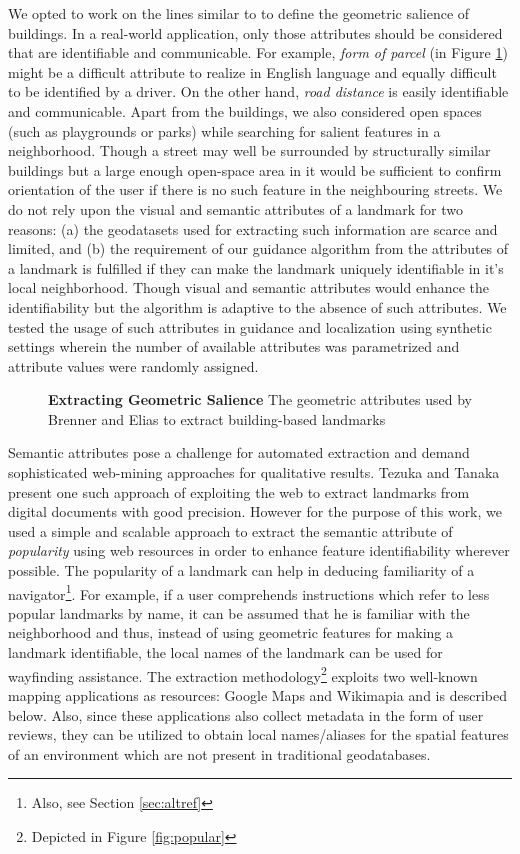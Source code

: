 \documentclass{iitkthesis}
\begin{document}
We opted to work on the lines similar to \cite{brenner} to define the 
geometric salience of buildings. In a real-world application, only those 
attributes should be considered that are identifiable and communicable. 
For example, \textit{form of parcel} (in Figure \ref{fig:elias}) might be 
a difficult attribute to realize in English language and equally 
difficult to be identified by a driver. On the other hand, \textit{road 
distance} is easily identifiable and communicable. Apart from the 
buildings, we also considered open spaces (such as playgrounds or parks) 
while searching for salient features in a neighborhood. Though a street 
may well be surrounded by structurally similar buildings but a large 
enough open-space area in it would be sufficient to confirm orientation 
of the user if there is no such feature in the neighbouring streets. We 
do not rely upon the visual and semantic attributes of a landmark for two 
reasons: (a) the geodatasets used for extracting such information are 
scarce and limited, and (b) the requirement of our guidance algorithm 
from the attributes of a landmark is fulfilled if they can make the 
landmark uniquely identifiable in it's local neighborhood. Though visual 
and semantic attributes would enhance the identifiability but the 
algorithm is adaptive to the absence of such attributes. We tested the 
usage of such attributes in guidance and localization using synthetic 
settings wherein the number of available attributes was parametrized and 
attribute values were randomly assigned.

\begin{figure}
\centering
{}
\caption{\textbf{Extracting Geometric Salience} The geometric attributes 
used by Brenner and Elias \cite{brenner} to extract building-based 
landmarks}
\label{fig:elias}
 \end{figure}

Semantic attributes pose a challenge for automated extraction and demand 
sophisticated web-mining approaches for qualitative results. Tezuka 
and Tanaka~\cite{tezuka} present one such approach of exploiting the
web to extract landmarks from digital documents with good precision. 
However for the purpose of this work, we used a simple and scalable 
approach to extract the semantic attribute of \textit{popularity} using web 
resources in order to enhance feature identifiability wherever possible. 
The popularity of a landmark can help in deducing familiarity of a 
navigator\footnote{Also, see Section \ref{sec:altref}}. For example, if a 
user comprehends instructions which refer to less popular landmarks by 
name, it can be assumed that he is familiar with the neighborhood 
and thus, instead of using geometric features for making a landmark 
identifiable, the local names of the landmark can be used for wayfinding 
assistance. The extraction methodology\footnote{Depicted in Figure \ref{fig:popular}}
 exploits two well-known mapping applications as resources: Google Maps \cite{gmaps} and Wikimapia 
\cite{wiki} and is described below.  Also, since these applications also collect metadata in 
the form of user reviews, they can be utilized to obtain local names/aliases 
for the spatial features of an environment which are not present in 
traditional geodatabases.
\end{document}
